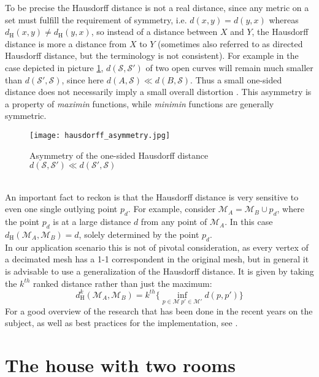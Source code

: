 To be precise the Hausdorff distance is not a real distance, since any metric on a set must fulfill the requirement of symmetry, i.e. $d(x,y) = d(y,x)$ whereas $d_{\mathrm H}(x,y) \neq d_{\mathrm H}(y,x)$, so instead of a distance between $X$ and $Y$, the Hausdorff distance is more a distance from $X$ to $Y$ (sometimes also referred to as directed Hausdorff distance, but the terminology is not consistent).
For example in the case depicted in picture \ref{fig:hausdorff_asymmetry}, $d(\mathcal{S}, \mathcal{S}')$ of two open curves will remain much smaller than $d(\mathcal{S}', \mathcal{S})$, since here $d(A, \mathcal{S}) \ll d(B, \mathcal{S})$.
Thus a small one-sided distance does not necessarily imply a small overall distortion \citep[][cf. pp.705-706]{Aspert2002}.
This asymmetry is a property of \textit{maximin} functions, while \textit{minimin} functions are generally symmetric.
\begin{figure}[ht]
\centering
\texttt{[image: hausdorff\_asymmetry.jpg]}
\caption{Asymmetry of the one-sided Hausdorff distance $d(\mathcal{S}, \mathcal{S}') \ll d(\mathcal{S}', \mathcal{S})$}
\label{fig:hausdorff_asymmetry}
\end{figure}\\
An important fact to reckon is that the Hausdorff distance is very sensitive to even one single outlying point $p_{d}$.
For example, consider $\mathcal{M}_{A} = \mathcal{M}_{B} \cup p_{d}$, where the point $p_{d}$ is at a large distance $d$ from any point of $\mathcal{M}_{A}$.
In this case $d_{\mathrm H}(\mathcal{M}_{A},\mathcal{M}_{B}) = d$, solely determined by the point $p_{d}$.\\
In our application scenario this is not of pivotal consideration, as every vertex of a decimated mesh has a 1-1 correspondent in the original mesh, but in general it is advisable to use a generalization of the Hausdorff distance.
It is given by taking the $k^{th}$ ranked distance rather than just the maximum:
\begin{equation} \label{eq:k_hausdorff}
d^{k}_{\mathrm H}(\mathcal{M}_{A},\mathcal{M}_{B}) = k^{th}\{\inf_{ p \in \mathcal{M} ~ p' \in \mathcal{M}'} d(p,p')\}
\end{equation}
For a good overview of the research that has been done in the recent years on the subject, as well as best practices for the implementation, see \citep[][]{Barton2010}.

\newpage
\vspace*{1ex}
\section{The house with two rooms}
\label{two_rooms}

